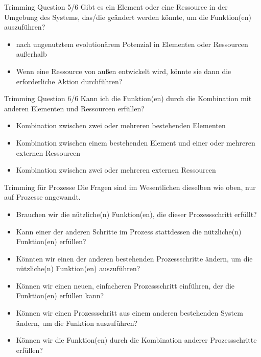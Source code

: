 \documentclass{beamer}
\begin{document}
	
	\begin{frame}{Trimming Question 5/6}
		Gibt es ein Element oder eine Ressource in der Umgebung des Systems, das/die geändert werden könnte, um die Funktion(en) auszuführen?
		\begin{itemize}
			\item nach ungenutztem evolutionärem Potenzial in Elementen oder Ressourcen außerhalb
			\item Wenn eine Ressource von außen entwickelt wird, könnte sie dann die erforderliche Aktion durchführen?
		\end{itemize}
	\end{frame}
	
	\begin{frame}{Trimming Question 6/6}
		Kann ich die Funktion(en) durch die Kombination mit anderen Elementen und Ressourcen erfüllen?
		\begin{itemize}
			\item Kombination zwischen zwei oder mehreren bestehenden Elementen
			\item Kombination zwischen einem bestehenden Element und einer oder mehreren externen Ressourcen
			\item Kombination zwischen zwei oder mehreren externen Ressourcen
		\end{itemize}
	\end{frame}
	

	\begin{frame}{Trimming für Prozesse}
		Die Fragen sind im Wesentlichen dieselben wie oben, nur auf Prozesse angewandt.
		\begin{itemize}
			\item Brauchen wir die nützliche(n) Funktion(en), die dieser Prozessschritt erfüllt?
			\item Kann einer der anderen Schritte im Prozess stattdessen die nützliche(n) Funktion(en) erfüllen?
			\item Könnten wir einen der anderen bestehenden Prozessschritte ändern, um die nützliche(n) Funktion(en) auszuführen?
			\item Können wir einen neuen, einfacheren Prozessschritt einführen, der die Funktion(en) erfüllen kann?
			\item Können wir einen Prozessschritt aus einem anderen bestehenden System ändern, um die Funktion auszuführen?
			\item Können wir die Funktion(en) durch die Kombination anderer Prozessschritte erfüllen?
		\end{itemize}
	\end{frame}
	
\end{document}
